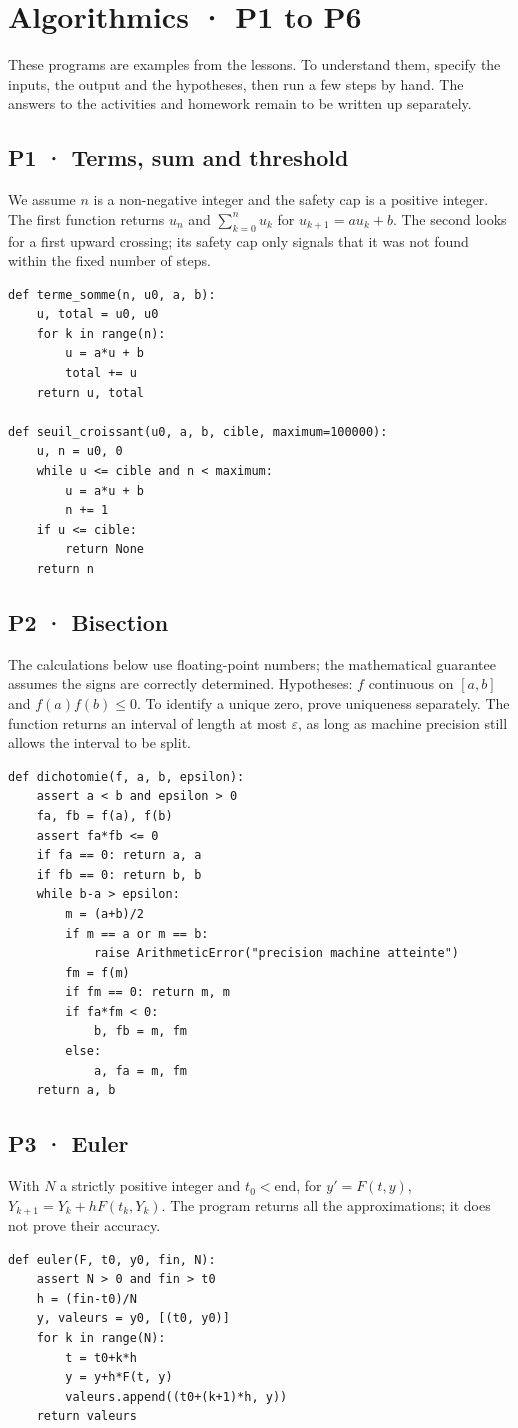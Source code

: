 \chapter{Algorithmics · P1 to P6}
These programs are examples from the lessons. To understand them, specify the inputs, the output and the hypotheses, then run a few steps by hand. The answers to the activities and homework remain to be written up separately.
\section{P1 · Terms, sum and threshold}
We assume $n$ is a non-negative integer and the safety cap is a positive integer. The first function returns $u_n$ and $\sum_{k=0}^n u_k$ for $u_{k+1}=au_k+b$. The second looks for a first upward crossing; its safety cap only signals that it was not found within the fixed number of steps.
\begin{lstlisting}
def terme_somme(n, u0, a, b):
    u, total = u0, u0
    for k in range(n):
        u = a*u + b
        total += u
    return u, total

def seuil_croissant(u0, a, b, cible, maximum=100000):
    u, n = u0, 0
    while u <= cible and n < maximum:
        u = a*u + b
        n += 1
    if u <= cible:
        return None
    return n
\end{lstlisting}
\section{P2 · Bisection}
The calculations below use floating-point numbers; the mathematical guarantee assumes the signs are correctly determined. Hypotheses: $f$ continuous on $[a,b]$ and $f(a)f(b)\le0$. To identify a unique zero, prove uniqueness separately. The function returns an interval of length at most $\varepsilon$, as long as machine precision still allows the interval to be split.
\begin{lstlisting}
def dichotomie(f, a, b, epsilon):
    assert a < b and epsilon > 0
    fa, fb = f(a), f(b)
    assert fa*fb <= 0
    if fa == 0: return a, a
    if fb == 0: return b, b
    while b-a > epsilon:
        m = (a+b)/2
        if m == a or m == b:
            raise ArithmeticError("precision machine atteinte")
        fm = f(m)
        if fm == 0: return m, m
        if fa*fm < 0:
            b, fb = m, fm
        else:
            a, fa = m, fm
    return a, b
\end{lstlisting}
\clearpage\section{P3 · Euler}
With $N$ a strictly positive integer and $t_0<\text{end}$, for $y'=F(t,y)$, $Y_{k+1}=Y_k+hF(t_k,Y_k)$. The program returns all the approximations; it does not prove their accuracy.
\begin{lstlisting}
def euler(F, t0, y0, fin, N):
    assert N > 0 and fin > t0
    h = (fin-t0)/N
    y, valeurs = y0, [(t0, y0)]
    for k in range(N):
        t = t0+k*h
        y = y+h*F(t, y)
        valeurs.append((t0+(k+1)*h, y))
    return valeurs
\end{lstlisting}
